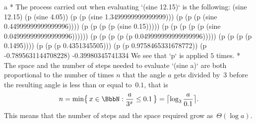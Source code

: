 \begitems\style a
* The process carried out when evaluating `(sine 12.15)` is the following:
\begtt\scm
(sine 12.15)
(p (sine 4.05))
(p (p (sine 1.3499999999999999)))
(p (p (p (sine 0.44999999999999996))))
(p (p (p (p (sine 0.15)))))
(p (p (p (p (p (sine 0.049999999999999996))))))
(p (p (p (p (p 0.049999999999999996)))))
(p (p (p (p 0.1495))))
(p (p (p 0.4351345505)))
(p (p 0.9758465331678772))
(p -0.7895631144708228)
-0.39980345741334
\endtt
We see that `p` is applied $5$ times.
\smallskip
* The space and the number of steps needed to evaluate `(sine a)` are both proportional to the number of times $n$ that the angle $a$ gets divided by~$3$ before the resulting angle is less than or equal to~$0.1$, that is
$$
n = \min\bigl\{\,x\in \BbbN : {a\over 3^x} \leq 0.1\,\bigr\} = \bigl\lceil\log_3{a \over 0.1}\bigr\rceil \hbox{.}
$$ 
This means that the number of steps and the space required grow as~$\Theta(\log a)$.
\enditems
